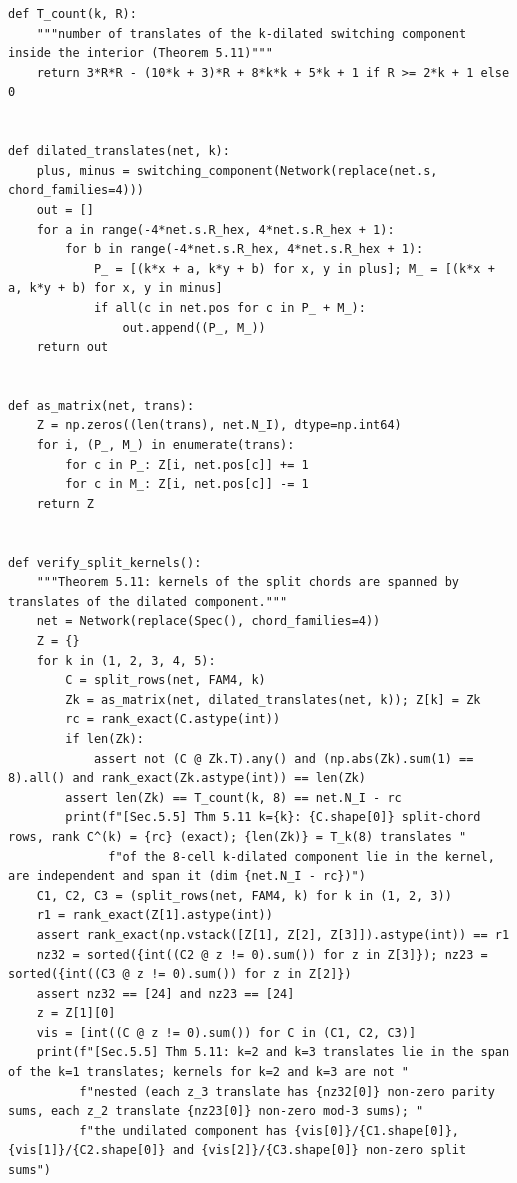 \documentclass[11pt,a4paper]{article}
\theoremstyle{definition}
\theoremstyle{remark}
\begin{document}
\begin{lstlisting}
def T_count(k, R):
    """number of translates of the k-dilated switching component inside the interior (Theorem 5.11)"""
    return 3*R*R - (10*k + 3)*R + 8*k*k + 5*k + 1 if R >= 2*k + 1 else 0


def dilated_translates(net, k):
    plus, minus = switching_component(Network(replace(net.s, chord_families=4)))
    out = []
    for a in range(-4*net.s.R_hex, 4*net.s.R_hex + 1):
        for b in range(-4*net.s.R_hex, 4*net.s.R_hex + 1):
            P_ = [(k*x + a, k*y + b) for x, y in plus]; M_ = [(k*x + a, k*y + b) for x, y in minus]
            if all(c in net.pos for c in P_ + M_):
                out.append((P_, M_))
    return out


def as_matrix(net, trans):
    Z = np.zeros((len(trans), net.N_I), dtype=np.int64)
    for i, (P_, M_) in enumerate(trans):
        for c in P_: Z[i, net.pos[c]] += 1
        for c in M_: Z[i, net.pos[c]] -= 1
    return Z


def verify_split_kernels():
    """Theorem 5.11: kernels of the split chords are spanned by translates of the dilated component."""
    net = Network(replace(Spec(), chord_families=4))
    Z = {}
    for k in (1, 2, 3, 4, 5):
        C = split_rows(net, FAM4, k)
        Zk = as_matrix(net, dilated_translates(net, k)); Z[k] = Zk
        rc = rank_exact(C.astype(int))
        if len(Zk):
            assert not (C @ Zk.T).any() and (np.abs(Zk).sum(1) == 8).all() and rank_exact(Zk.astype(int)) == len(Zk)
        assert len(Zk) == T_count(k, 8) == net.N_I - rc
        print(f"[Sec.5.5] Thm 5.11 k={k}: {C.shape[0]} split-chord rows, rank C^(k) = {rc} (exact); {len(Zk)} = T_k(8) translates "
              f"of the 8-cell k-dilated component lie in the kernel, are independent and span it (dim {net.N_I - rc})")
    C1, C2, C3 = (split_rows(net, FAM4, k) for k in (1, 2, 3))
    r1 = rank_exact(Z[1].astype(int))
    assert rank_exact(np.vstack([Z[1], Z[2], Z[3]]).astype(int)) == r1
    nz32 = sorted({int((C2 @ z != 0).sum()) for z in Z[3]}); nz23 = sorted({int((C3 @ z != 0).sum()) for z in Z[2]})
    assert nz32 == [24] and nz23 == [24]
    z = Z[1][0]
    vis = [int((C @ z != 0).sum()) for C in (C1, C2, C3)]
    print(f"[Sec.5.5] Thm 5.11: k=2 and k=3 translates lie in the span of the k=1 translates; kernels for k=2 and k=3 are not "
          f"nested (each z_3 translate has {nz32[0]} non-zero parity sums, each z_2 translate {nz23[0]} non-zero mod-3 sums); "
          f"the undilated component has {vis[0]}/{C1.shape[0]}, {vis[1]}/{C2.shape[0]} and {vis[2]}/{C3.shape[0]} non-zero split sums")



\end{lstlisting}
\end{document}
